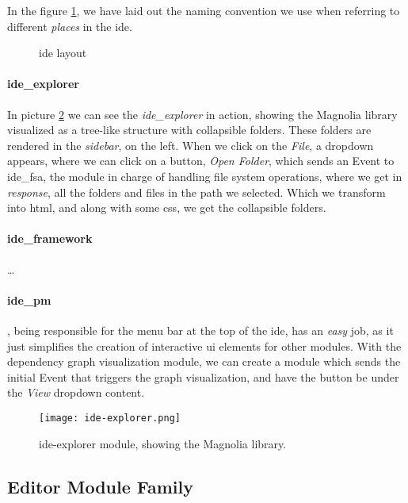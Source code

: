 In the figure \ref{fig:ideLayout}, we have laid out the naming convention we
use when referring to different \textit{places} in the \gls*{ide}.

\begin{figure}[H]
  \centering
  
  \caption{\gls*{ide} layout}
  \label{fig:ideLayout}
\end{figure}

\paragraph{ide\_explorer} In picture \ref{pic:ideEx} we can see the
\textit{ide\_explorer} in action, showing the Magnolia library visualized as a
tree-like structure with collapsible folders. These folders are rendered in the
\textit{sidebar}, on the left. When we click on the \textit{File}, a dropdown
appears, where we can click on a button, \textit{Open Folder}, which sends an
Event to \gls*{ide}\_fsa, the module in charge of handling file system
operations, where we get in \textit{response}, all the folders and files in the
path we selected. Which we transform into \gls*{html}, and along with some
\gls*{css}, we get the collapsible folders.

\paragraph{ide\_framework} \dots

\paragraph{ide\_pm}, being responsible for the menu bar at the top of the
\gls*{ide}, has an \textit{easy} job, as it just simplifies the creation of
interactive \gls*{ui} elements for other modules. With the dependency graph
visualization module, we can create a module which sends the initial Event that
triggers the graph visualization, and have the button be under the \textit{View}
dropdown content.

\begin{figure}
  \centering
  \texttt{[image: ide-explorer.png]}
  \caption{
    \gls*{ide}-explorer module, showing the Magnolia library.
  }
  \label{pic:ideEx}
\end{figure}

\subsection{Editor Module Family}

